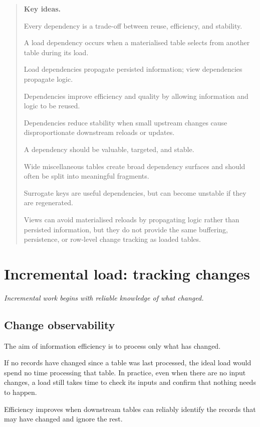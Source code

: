 \documentclass[10pt,openany,10pt]{book}
\begin{document}
\begin{quote}
\textbf{Key ideas.}

Every dependency is a trade-off between reuse, efficiency, and
stability.

A load dependency occurs when a materialised table selects from another
table during its load.

Load dependencies propagate persisted information; view dependencies
propagate logic.

Dependencies improve efficiency and quality by allowing information and
logic to be reused.

Dependencies reduce stability when small upstream changes cause
disproportionate downstream reloads or updates.

A dependency should be valuable, targeted, and stable.

Wide miscellaneous tables create broad dependency surfaces and should
often be split into meaningful fragments.

Surrogate keys are useful dependencies, but can become unstable if they
are regenerated.

Views can avoid materialised reloads by propagating logic rather than
persisted information, but they do not provide the same buffering,
persistence, or row-level change tracking as loaded tables.
\end{quote}

\newpage

\chapter{Incremental load: tracking
changes}\label{docs-efficient-stable-pipeline-tracking-changes}

\emph{Incremental work begins with reliable knowledge of what changed.}

\section{Change observability}\label{change-observability}

The aim of information efficiency is to process only what has changed.

If no records have changed since a table was last processed, the ideal
load would spend no time processing that table. In practice, even when
there are no input changes, a load still takes time to check its inputs
and confirm that nothing needs to happen.

Efficiency improves when downstream tables can reliably identify the
records that may have changed and ignore the rest.
\end{document}
